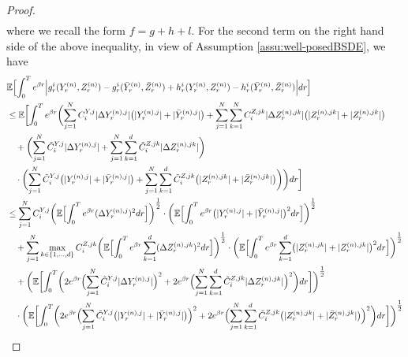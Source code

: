 \documentclass[10pt,a4paper]{article}
\theoremstyle{plain}
\theoremstyle{definition}
\numberwithin{equation}{section}
\begin{document}
\begin{proof}
\begin{align}
\end{align}
where we recall the form $f = g+h+l$. 
For the second term on the right hand side of the above inequality, in view of Assumption \ref{assu:well-posedBSDE}, we have
\begin{align}
&\mathbb{E}\Bigl[\int_{0}^{T}e^{\beta r}\Bigl|g_{r}^{i}(Y_{r}^{(n)},Z_{r}^{(n)})-g_{r}^{i}(\bar{Y}_{r}^{(n)},\bar{Z}_{r}^{(n)}) + h_{r}^{i}(Y_{r}^{(n)},Z_{r}^{(n)})-h_{r}^{i}(\bar{Y}_{r}^{(n)},\bar{Z}_{r}^{(n)})\Bigr|dr\Bigr] \nonumber \\
&\leq \mathbb{E}\biggl[\int_{0}^{T}e^{\beta r}\biggl(\sum_{j=1}^{N}C_{i}^{Y,j}|\Delta Y_{r}^{(n),j}|\bigl(|Y_{r}^{(n),j}|+|\bar{Y}_{r}^{(n),j}|\bigr) + \sum_{j=1}^{N}\sum_{k=1}^{N}C_{i}^{Z,jk}|\Delta Z_{r}^{(n),jk}|\bigl(|Z_{r}^{(n),jk}|+|Z_{r}^{(n),jk}|\bigr) \nonumber \\
&\ \ \ + \biggl(\sum_{j=1}^{N}\tilde{C}_{i}^{Y,j}|\Delta Y_{r}^{(n),j}| + \sum_{j=1}^{N}\sum_{k=1}^{d}\tilde{C}_{i}^{Z,jk}|\Delta Z_{r}^{(n),jk}|\biggr) \nonumber \\
&\ \ \ \cdot\biggl(\sum_{j=1}^{N}\tilde{C}_{i}^{Y,j}\bigl(|Y_{r}^{(n),j}|+|\bar{Y}_{r}^{(n),j}|\bigr) + \sum_{j=1}^{N}\sum_{k=1}^{d}\tilde{C}_{i}^{Z,jk}\bigl(|Z_{r}^{(n),jk}|+|\bar{Z}_{r}^{(n),jk}|\bigr)\biggr)\biggr)dr\biggr] \nonumber \\
&\leq \sum_{j=1}^{N}C_{i}^{Y,j}\biggl(\mathbb{E}\Bigl[\int_{0}^{T}e^{\beta r}(\Delta Y_{r}^{(n),j})^{2}dr\Bigr]\biggr)^{\tfrac{1}{2}}\cdot\biggl(\mathbb{E}\Bigl[\int_{0}^{T}e^{\beta r}\bigl(|Y_{r}^{(n),j}|+|\bar{Y}_{r}^{(n),j}|\bigr)^{2}dr\Bigr]\biggr)^{\tfrac{1}{2}} \nonumber \\
&\ \ \ + \sum_{j=1}^{N}\max_{k \in \{1,...,d\}}C_{i}^{Z,jk}\biggl(\mathbb{E}\Bigl[\int_{0}^{T}e^{\beta r}\sum_{k=1}^{d}(\Delta Z_{r}^{(n),jk})^{2}dr\Bigr]\biggr)^{\tfrac{1}{2}}\cdot\biggl(\mathbb{E}\Bigl[\int_{0}^{T}e^{\beta r}\sum_{k=1}^{d}\bigl(|Z_{r}^{(n),jk}|+|Z_{r}^{(n),jk}|\bigr)^{2}dr\Bigr]\biggr)^{\tfrac{1}{2}} \nonumber \\
&\ \ \ + \biggl(\mathbb{E}\biggl[\int_{0}^{T}\biggl(2e^{\beta r}\Bigl(\sum_{j=1}^{N}\tilde{C}_{i}^{Y,j}|\Delta Y_{r}^{(n),j}|\Bigr)^{2} + 2e^{\beta r}\Bigl(\sum_{j=1}^{N}\sum_{k=1}^{d}\tilde{C}_{i}^{Z,jk}|\Delta Z_{r}^{(n),jk}|\Bigr)^{2}\biggr)dr\biggr]\biggr)^{\tfrac{1}{2}} \nonumber \\
&\ \ \ \cdot \biggl(\mathbb{E}\biggl[\int_{0}^{T}\biggl(2e^{\beta r}\Bigl(\sum_{j=1}^{N}\tilde{C}_{i}^{Y,j}\bigl(|Y_{r}^{(n),j}|+|\bar{Y}_{r}^{(n),j}|\bigr)\Bigr)^{2} + 2e^{\beta r}\Bigl(\sum_{j=1}^{N}\sum_{k=1}^{d}\tilde{C}_{i}^{Z,jk}\bigl(|Z_{r}^{(n),jk}|+|\bar{Z}_{r}^{(n),jk}|\bigr)\Bigr)^{2}\biggr)dr\biggr]\biggr)^{\tfrac{1}{2}} \nonumber \\

\end{align}
\end{proof}
\end{document}
